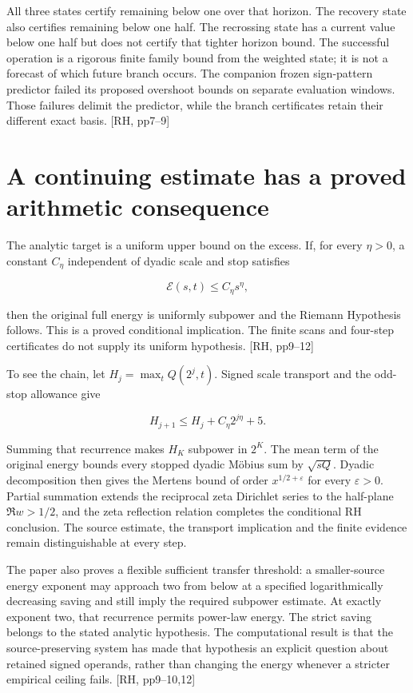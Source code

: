 All three states certify remaining below one over that horizon. The recovery state also certifies remaining below one half. The recrossing state has a current value below one half but does not certify that tighter horizon bound. The successful operation is a rigorous finite family bound from the weighted state; it is not a forecast of which future branch occurs. The companion frozen sign-pattern predictor failed its proposed overshoot bounds on separate evaluation windows. Those failures delimit the predictor, while the branch certificates retain their different exact basis. {[}RH, pp7--9{]}

\section{A continuing estimate has a proved arithmetic consequence}\label{a-continuing-estimate-has-a-proved-arithmetic-consequence}

The analytic target is a uniform upper bound on the excess. If, for every \(\eta>0\), a constant \(C_\eta\) independent of dyadic scale and stop satisfies

\[
\mathcal E(s,t)\le C_\eta s^\eta,
\]

then the original full energy is uniformly subpower and the Riemann Hypothesis follows. This is a proved conditional implication. The finite scans and four-step certificates do not supply its uniform hypothesis. {[}RH, pp9--12{]}

To see the chain, let \(H_j=\max_t Q(2^j,t)\). Signed scale transport and the odd-stop allowance give

\[
H_{j+1}\le H_j+C_\eta 2^{j\eta}+5.
\]

Summing that recurrence makes \(H_K\) subpower in \(2^K\). The mean term of the original energy bounds every stopped dyadic Möbius sum by \(\sqrt{sQ}\). Dyadic decomposition then gives the Mertens bound of order \(x^{1/2+\varepsilon}\) for every \(\varepsilon>0\). Partial summation extends the reciprocal zeta Dirichlet series to the half-plane \(\Re w>1/2\), and the zeta reflection relation completes the conditional RH conclusion. The source estimate, the transport implication and the finite evidence remain distinguishable at every step.

The paper also proves a flexible sufficient transfer threshold: a smaller-source energy exponent may approach two from below at a specified logarithmically decreasing saving and still imply the required subpower estimate. At exactly exponent two, that recurrence permits power-law energy. The strict saving belongs to the stated analytic hypothesis. The computational result is that the source-preserving system has made that hypothesis an explicit question about retained signed operands, rather than changing the energy whenever a stricter empirical ceiling fails. {[}RH, pp9--10,12{]}
